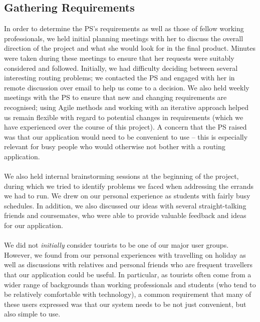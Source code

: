 \documentclass[a4paper, 10pt]{report}
\begin{document}
\subsection{Gathering Requirements}
In order to determine the PS's requirements as well as those of fellow working professionals, we held initial planning meetings with her to discuss the overall direction of the project and what she would look for in the final product. Minutes were taken during these meetings to ensure that her requests were suitably considered and followed. Initially, we had difficulty deciding between several interesting routing problems; we contacted the PS and engaged with her in remote discussion over email to help us come to a decision. We also held weekly meetings with the PS to ensure that new and changing requirements are recognised; using Agile methods and working with an iterative approach helped us remain flexible with regard to potential changes in requirements (which we have experienced over the course of this project). A concern that the PS raised was that our application would need to be convenient to use -- this is especially relevant for busy people who would otherwise not bother with a routing application. \\\\
We also held internal brainstorming sessions at the beginning of the project, during which we tried to identify problems we faced when addressing the errands we had to run. We drew on our personal experience as students with fairly busy schedules. In addition, we also discussed our ideas with several straight-talking friends and coursemates, who were able to provide valuable feedback and ideas for our application. \\\\
We did not \textit{initially} consider tourists to be one of our major user groups. However, we found from our personal experiences with travelling on holiday as well as discussions with relatives and personal friends who are frequent travellers that our application could be useful. In particular, as tourists often come from a wider range of backgrounds than working professionals and students (who tend to be relatively comfortable with technology), a common requirement that many of these users expressed was that our system needs to be not just convenient, but also simple to use.
\end{document}
